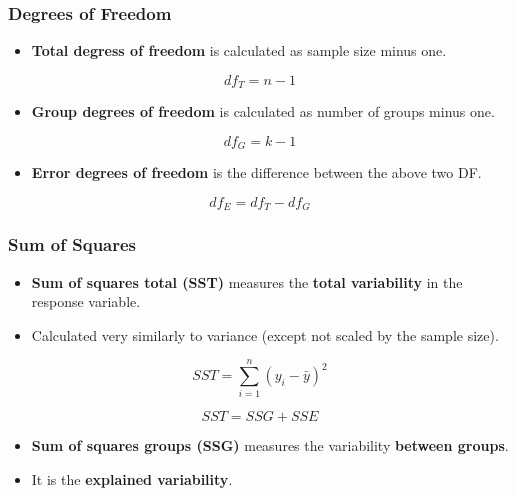 \documentclass[]{book}
\providecommand{\tightlist}{%
  \setlength{\itemsep}{0pt}\setlength{\parskip}{0pt}}
\begin{document}
\hypertarget{degrees-of-freedom}{%
\subsubsection*{Degrees of Freedom}\label{degrees-of-freedom}}

\begin{itemize}
\tightlist
\item
  \textbf{Total degress of freedom} is calculated as sample size minus one.
\end{itemize}

\[
df_T = n - 1
\]

\begin{itemize}
\tightlist
\item
  \textbf{Group degrees of freedom} is calculated as number of groups minus one.
\end{itemize}

\[
df_G = k - 1
\]

\begin{itemize}
\tightlist
\item
  \textbf{Error degrees of freedom} is the difference between the above two DF.
\end{itemize}

\[
df_E = df_T - df_G
\]

\hypertarget{sum-of-squares}{%
\subsubsection*{Sum of Squares}\label{sum-of-squares}}

\begin{itemize}
\tightlist
\item
  \textbf{Sum of squares total (SST)} measures the \textbf{total variability} in the response variable.
\item
  Calculated very similarly to variance (except not scaled by the sample size).
\end{itemize}

\[
SST = \sum^n_{i=1} (y_i - \bar{y})^2
\]

\[
SST = SSG + SSE
\]

\begin{itemize}
\tightlist
\item
  \textbf{Sum of squares groups (SSG)} measures the variability \textbf{between groups}.
\item
  It is the \textbf{explained variability}.
\end{itemize}
\end{document}
